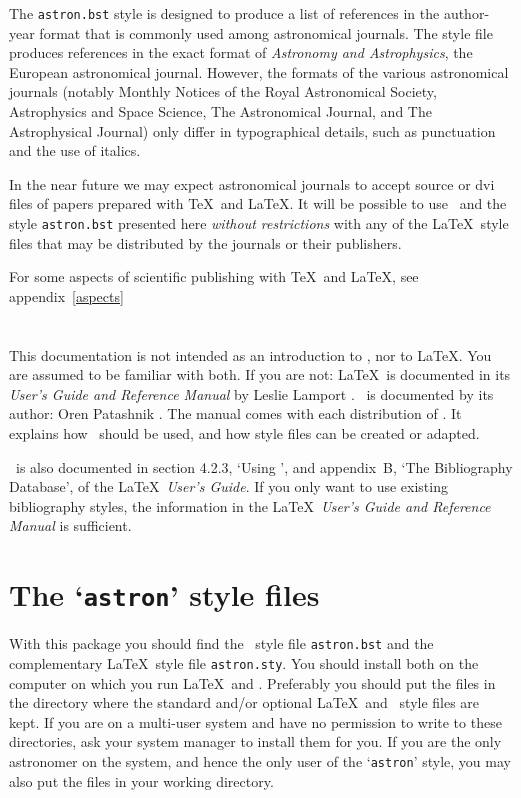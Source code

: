 The {\tt astron.bst} style is designed to produce a list of references in
the author-year format that is commonly used among astronomical journals.
The style file produces references in the exact format of
{\sl Astronomy and Astrophysics}, the European astronomical journal.
However, the formats of the various astronomical journals (notably
Monthly Notices of the Royal Astronomical Society, Astrophysics and
Space Science, The Astronomical Journal, and The Astrophysical Journal)
only differ in typographical details, such as punctuation and the use
of italics.

In the near future we may expect astronomical journals to accept
source or {\sc dvi} files of papers prepared with \TeX\ and \LaTeX.
It will be possible to use \BibTeX\ and the style {\tt astron.bst}
presented here {\sl without restrictions\/} with any of the \LaTeX\ style
files that may be distributed by the journals or their publishers.

For some aspects of scientific publishing with \TeX\ and \LaTeX, see
appendix~\ref{aspects}

\section{\BibTeX}

This documentation is not intended as an introduction to \BibTeX,
nor to \LaTeX.
You are assumed to be familiar with both.
If you are not: \LaTeX\ is documented in its {\sl User's Guide and
Reference Manual\/} by Leslie Lamport \cite*{lamport}.
\BibTeX\ is documented by its author: Oren Patashnik \cite*{patashnik}.
The manual comes with each distribution of \BibTeX.
It explains how \BibTeX\ should be used, and how style files can be created
or adapted.

\BibTeX\ is also documented in section 4.2.3, `Using \BibTeX', and appendix~B,
`The Bibliography Database', of the \LaTeX\ {\sl User's Guide}.
If you only want to use existing bibliography styles, the
information in the \LaTeX\ {\sl User's Guide and Reference Manual\/}
\cite{lamport} is sufficient.

\section{The `{\tt astron}' style files}

With this package you should find the \BibTeX\ style file {\tt astron.bst}
and the complementary \LaTeX\ style file {\tt astron.sty}.
You should install both on the computer on which you run \LaTeX\ and
\BibTeX.
Preferably you should put the files in the directory where the standard
and/or optional \LaTeX\ and \BibTeX\ style files are kept.
If you are on a multi-user system and have no permission to write
to these directories, ask your system manager to install them for you.
If you are the only astronomer on the system, and hence the only user of
the `{\tt astron}' style, you may also put the files in your working
directory.

